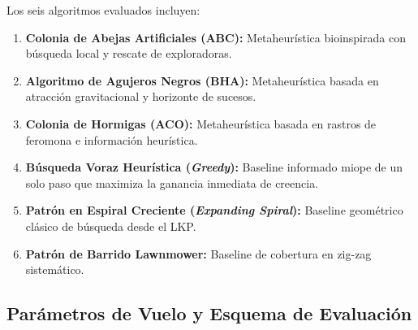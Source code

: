 Los seis algoritmos evaluados incluyen:
\begin{enumerate}
    \item \textbf{Colonia de Abejas Artificiales (ABC):} Metaheurística bioinspirada con búsqueda local y rescate de exploradoras.
    \item \textbf{Algoritmo de Agujeros Negros (BHA):} Metaheurística basada en atracción gravitacional y horizonte de sucesos.
    \item \textbf{Colonia de Hormigas (ACO):} Metaheurística basada en rastros de feromona e información heurística.
    \item \textbf{Búsqueda Voraz Heurística (\textit{Greedy}):} Baseline informado miope de un solo paso que maximiza la ganancia inmediata de creencia.
    \item \textbf{Patrón en Espiral Creciente (\textit{Expanding Spiral}):} Baseline geométrico clásico de búsqueda desde el LKP.
    \item \textbf{Patrón de Barrido Lawnmower:} Baseline de cobertura en zig-zag sistemático.
\end{enumerate}

\subsection{Parámetros de Vuelo y Esquema de Evaluación}

